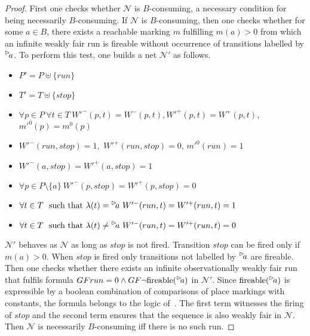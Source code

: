 \begin{proof}
\noindent First one checks whether $\mathcal N$ is $B$-consuming,
a necessary condition for being necessarily $B$-consuming. 
If $\mathcal N$ is $B$-consuming, then one checks whether
for some $a \in B$, there exists a reachable marking $m$ fulfilling $m(a)>0$ from which an infinite
weakly fair run is fireable without occurrence of transitions labelled by $\inact{a}$. To perform
this test, one builds a net $\mathcal N'$ as follows.
\begin{itemize}
%
	\item $P'=P\uplus \{run\}$
%
	\item $T'=T\uplus \{stop\}$ 
%
	\item $\forall p \in P\ \forall t \in T\ W'^-(p,t)=W^-(p,t), W'^+(p,t)=W^+(p,t)$, $m'^0(p)=m^0(p)$
%
	\item $W'^-(run,stop)=1,$ $W'^+(run,stop)=0$, $m'^0(run)=1$
%
	\item $W'^-(a,stop)=W'^+(a,stop)=1$
%
	\item $\forall p \in P\setminus \{a\}\  W'^-(p,stop)=W'^+(p,stop)=0$
%
	\item $\forall t \in T\ \mbox{ such that }\lambda(t)=\inact{a}\ W'^-(run,t)=W'^+(run,t)=1$
%
	\item $\forall t \in T\ \mbox{ such that }\lambda(t)\neq\inact{a}\ W'^-(run,t)=W'^+(run,t)=0$
%
\end{itemize}
$\mathcal N'$ behaves as $\mathcal N$ as long as $stop$ is not fired.
Transition $stop$ can be fired only if $m(a)>0$.
When $stop$ is fired only transitions not labelled by $\inact{a}$ are fireable.
Then one checks whether there exists an infinite observationally weakly fair run 
that fulfils formula $GF run=0 \wedge GF \neg \mbox{fireable}(\inact{a})$
in $\mathcal N'$. Since $\mbox{fireable}(\inact{a})$ is expressible
by a boolean combination of comparisons of place markings with constants,
the formula belongs to the logic of~\cite{Jancar90}.
The first term witnesses the firing of $stop$
and the second term ensures that the sequence is also weakly
fair in $\mathcal N$. Then $\mathcal N$ is necessarily $B$-consuming 
iff there is no such run. 

\end{proof}
